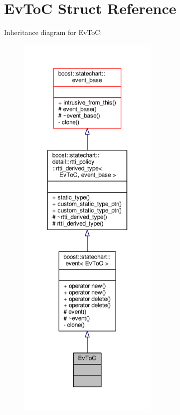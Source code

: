 \hypertarget{struct_ev_to_c}{}\section{Ev\+ToC Struct Reference}
\label{struct_ev_to_c}


Inheritance diagram for Ev\+ToC\+:
\nopagebreak
\begin{figure}[H]
\begin{center}
\leavevmode
\includegraphics[height=550pt]{struct_ev_to_c__inherit__graph}
\end{center}
\end{figure}


